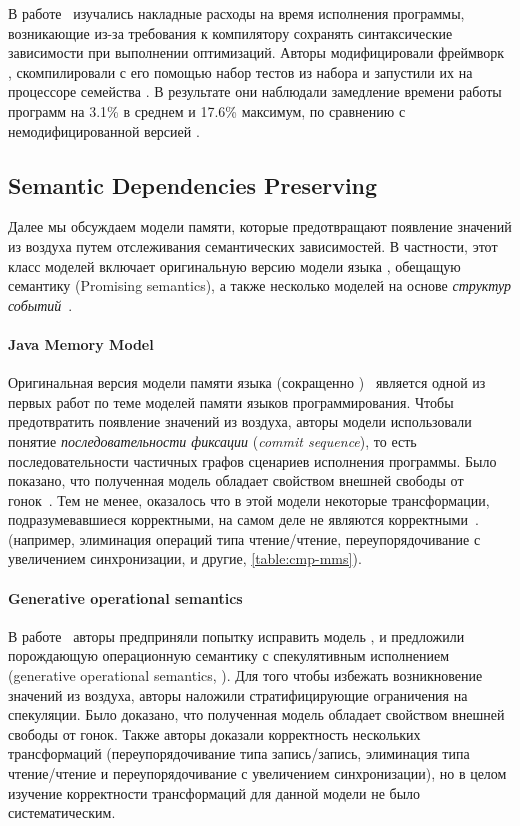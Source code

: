 В работе~\cite{Ou-Demsky:OOPSLA18} изучались накладные расходы
на время исполнения программы, возникающие из-за требования 
к компилятору сохранять синтаксические зависимости при выполнении оптимизаций. 
Авторы модифицировали фреймворк \LLVM, скомпилировали с его помощью 
набор тестов из набора \SPECCPU и запустили их на процессоре семейства .
В результате они наблюдали замедление времени работы программ 
на 3.1\% в среднем и 17.6\% максимум, по сравнению с немодифицированной версией \LLVM.  

\subsection{Semantic Dependencies Preserving}
\label{sec:catalog:sdeprf}

Далее мы обсуждаем модели памяти, 
которые предотвращают появление значений из воздуха 
путем отслеживания семантических зависимостей. 
В частности, этот класс моделей включает оригинальную 
версию модели языка \Java, обещащую семантику (Promising semantics), 
а также несколько моделей на основе \emph{структур событий}~\cite{Winskel:86}. 

\paragraph{Java Memory Model}
\label{sec:catalog:jmm}

Оригинальная версия модели памяти языка \Java (сокращенно \JMM)~\cite{Manson-al:POPL05}
является одной из первых работ по теме моделей памяти языков программирования.
Чтобы предотвратить появление значений из воздуха, 
авторы модели использовали понятие 
\emph{последовательности фиксации} (\emph{commit sequence}), 
то есть последовательности частичных графов сценариев исполнения программы. 
Было показано, что полученная модель обладает 
свойством внешней свободы от гонок~\cite{Huisman-Petri:CONCUR07}.
Тем не менее, оказалось что в этой модели
некоторые трансформации, подразумевавшиеся корректными, 
на самом деле не являются корректными~\cite{Sevcik-Aspinall:ECOOP08}.
(например, элиминация операций типа чтение/чтение, 
переупорядочивание с увеличением синхронизации, и другие, \see \cref{table:cmp-mms}). 

\paragraph{Generative operational semantics}

В работе~\cite{Jagadeesan-al:ESOP10} авторы предприняли попытку исправить модель \JMM,
и предложили порождающую операционную семантику с спекулятивным исполнением
(generative operational semantics, \GOS).
Для того чтобы избежать возникновение значений из воздуха, 
авторы наложили стратифицирующие ограничения на спекуляции. 
Было доказано, что полученная модель обладает свойством 
внешней свободы от гонок. 
Также авторы доказали корректность нескольких трансформаций
(переупорядочивание типа запись/запись, 
элиминация типа чтение/чтение и переупорядочивание с увеличением синхронизации), 
но в целом изучение корректности трансформаций для данной модели не было систематическим. 

